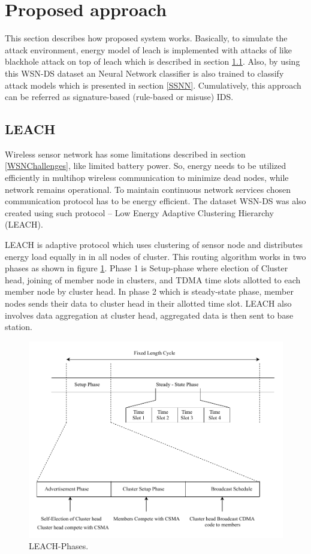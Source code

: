 \section{Proposed approach} \label{SPA}
This section describes how proposed system works. Basically, to simulate the attack environment, energy model of leach is implemented with attacks of like blackhole attack on top of leach which is described in section \ref{SSLeach}. Also, by using this WSN-DS dataset an Neural Network classifier is also trained to classify attack models which is presented in section \ref{SSNN}. Cumulatively, this approach can be referred as signature-based (rule-based or misuse) IDS. 
    \subsection{LEACH} \label{SSLeach}
    Wireless sensor network has some limitations described in section \ref{WSNChallenges}, like limited battery power. So, energy needs to be utilized efficiently in multihop wireless communication to minimize dead nodes, while network remains operational. To maintain continuous network services chosen communication protocol has to be energy efficient. The dataset WSN-DS was also created using such protocol – Low Energy Adaptive Clustering Hierarchy (LEACH). 
    \par LEACH \cite{palan2017low} is adaptive protocol which uses clustering of sensor node and distributes energy load equally in in all nodes of cluster. This routing algorithm works in two phases as shown in figure \ref{LeachPhases}. Phase 1 is Setup-phase where election of Cluster head, joining of member node in clusters, and TDMA time slots allotted to each member node by cluster head. In phase 2 which is steady-state phase, member nodes sends their data to cluster head in their allotted time slot. LEACH also involves data aggregation at cluster head, aggregated data is then sent to base station.
    \begin{figure}[h]
    \center	
    \includegraphics[scale=0.8]{Figures/PDF/LeachPhases.pdf}
    \caption{LEACH-Phases.}
    \label{LeachPhases}	
    \end{figure}
    \\

